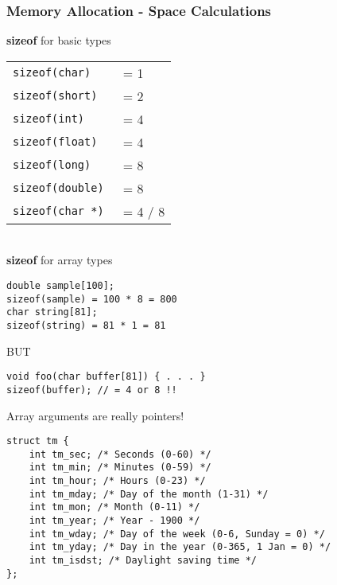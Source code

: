 \documentclass[10pt]{article}
\begin{document}
\begin{multicols}{2}
\begin{minipage}{\columnwidth}
        \subsubsection*{Memory Allocation - Space Calculations}
        \textbf{sizeof} for basic types \\
        \begin{tabular}{ll}
            \hline
            \lstinline|sizeof(char)|    & = 1     \\
            \lstinline|sizeof(short)|   & = 2     \\
            \lstinline|sizeof(int)|     & = 4     \\
            \lstinline|sizeof(float)|   & = 4     \\
            \lstinline|sizeof(long)|    & = 8     \\
            \lstinline|sizeof(double)|  & = 8     \\
            \lstinline|sizeof(char *) | & = 4 / 8 \\
            \hline
        \end{tabular}
        \\
        \textbf{sizeof} for array types
        \begin{lstlisting}
double sample[100];
sizeof(sample) = 100 * 8 = 800
char string[81];
sizeof(string) = 81 * 1 = 81
        \end{lstlisting}
        BUT
        \begin{lstlisting}
void foo(char buffer[81]) { . . . }
sizeof(buffer); // = 4 or 8 !!
\end{lstlisting}
        Array arguments are really pointers!
        \tiny
        \begin{lstlisting}
struct tm {
    int tm_sec; /* Seconds (0-60) */
    int tm_min; /* Minutes (0-59) */
    int tm_hour; /* Hours (0-23) */
    int tm_mday; /* Day of the month (1-31) */
    int tm_mon; /* Month (0-11) */
    int tm_year; /* Year - 1900 */
    int tm_wday; /* Day of the week (0-6, Sunday = 0) */
    int tm_yday; /* Day in the year (0-365, 1 Jan = 0) */
    int tm_isdst; /* Daylight saving time */
};
\end{lstlisting}
    \end{minipage}
    \begin{minipage}{\columnwidth}
        \begin{flushright}
            \begin{tabular}{|c|c|c|}
                \hline

\end{tabular}
\end{flushright}
\end{minipage}
\end{multicols}
\end{document}
